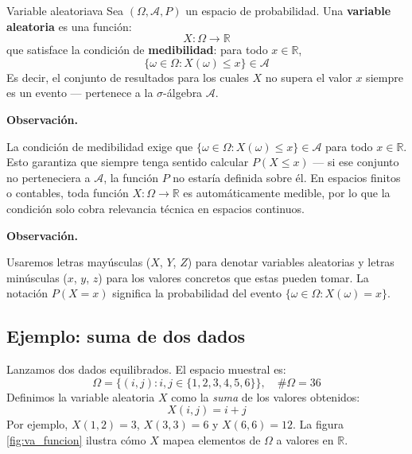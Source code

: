 \documentclass[12pt, a4paper]{book}
\newenvironment{observacion}{%
    \par\medskip\noindent\textbf{\color{azul}Observaci\'{o}n.}\enspace\itshape
}{\par\medskip}
\numberwithin{equation}{chapter}
\begin{document}
\begin{definicion}{Variable aleatoria}{va}
	Sea $(\Omega, \mathcal{A}, P)$ un espacio de probabilidad. Una 
	\textbf{variable aleatoria} es una función:
	\[
	X : \Omega \longrightarrow \mathbb{R}
	\]
	que satisface la condición de \textbf{medibilidad}: para todo 
	$x \in \mathbb{R}$,
	\[
	\{\omega \in \Omega : X(\omega) \leq x\} \in \mathcal{A}
	\]
	Es decir, el conjunto de resultados para los cuales $X$ no supera 
	el valor $x$ siempre es un evento — pertenece a la $\sigma$-álgebra 
	$\mathcal{A}$.
\end{definicion}

\begin{observacion}
	La condición de medibilidad exige que 
	$\{\omega \in \Omega : X(\omega) \leq x\} \in \mathcal{A}$ para 
	todo $x \in \mathbb{R}$. Esto garantiza que siempre tenga sentido 
	calcular $P(X \leq x)$ — si ese conjunto no perteneciera a 
	$\mathcal{A}$, la función $P$ no estaría definida sobre él. En 
	espacios finitos o contables, toda función $X: \Omega \to \mathbb{R}$ 
	es automáticamente medible, por lo que la condición solo cobra 
	relevancia técnica en espacios continuos.
\end{observacion}

\begin{observacion}
	Usaremos letras mayúsculas ($X$, $Y$, $Z$) para denotar variables 
	aleatorias y letras minúsculas ($x$, $y$, $z$) para los valores 
	concretos que estas pueden tomar. La notación $P(X = x)$ significa 
	la probabilidad del evento $\{\omega \in \Omega : X(\omega) = x\}$.
\end{observacion}

\subsection*{Ejemplo: suma de dos dados}

Lanzamos dos dados equilibrados. El espacio muestral es:
\[
\Omega = \{(i,j) : i,j \in \{1,2,3,4,5,6\}\}, \quad \#\Omega = 36
\]
Definimos la variable aleatoria $X$ como la \textit{suma} de los 
valores obtenidos:
\[
X(i,j) = i + j
\]
Por ejemplo, $X(1,2) = 3$, $X(3,3) = 6$ y $X(6,6) = 12$. La figura 
\ref{fig:va_funcion} ilustra cómo $X$ mapea elementos de $\Omega$ a 
valores en $\mathbb{R}$.
\end{document}
